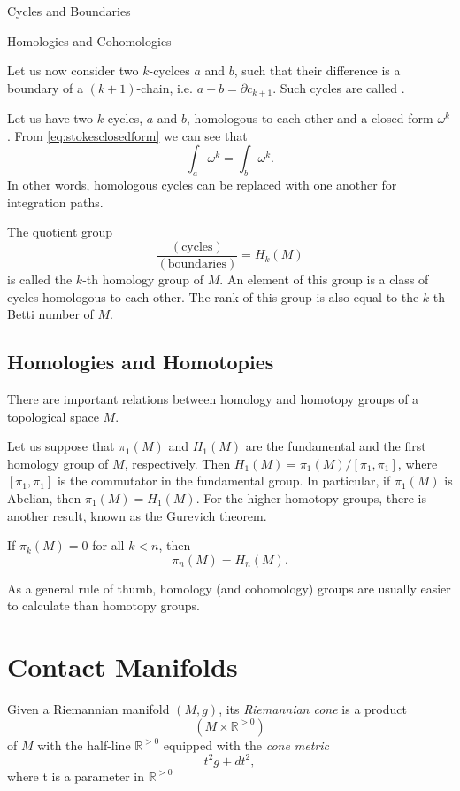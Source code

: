 \begin{subsubsection}{Cycles and Boundaries}
\begin{subsubsection}{Homologies and Cohomologies}
  \begin{definition}
  Let us now consider two $k$-cyclces $a$ and $b$, such that their 
  difference is a boundary of a $(k+1)$-chain, i.e. $a-b = \partial c_{k+1}$.
  Such cycles are called .
\end{definition}
  Let us have two $k$-cycles, $a$ and $b$, homologous to each other and
  a closed form $\omega^k$. From \eqref{eq:stokesclosedform} we can see that 
  \begin{equation}
    \int_a{\omega^k} = \int_b{\omega^k}.
  \end{equation}
  In other words, homologous cycles can be replaced with one another for
  integration paths.
  \begin{definition}
    The quotient group
    \begin{equation}
      \frac{(\text{cycles})}{(\text{boundaries})} = H_k(M)
    \end{equation}
    is called the $k$-th homology group of $M$. An element of this group is
    a class of cycles homologous to each other. The rank of this group is also
    equal to the $k$-th Betti number of $M$.
  \end{definition}
\subsection{Homologies and Homotopies}
There are important relations between homology and homotopy groups of
a topological space $M$.
\par Let us suppose that $\pi_1(M)$ and $H_1(M)$ are the fundamental and the
first homology group of $M$, respectively. Then $H_1(M)
= \pi_1(M)/[\pi_1,\pi_1]$, where $[\pi_1,\pi_1]$ is the commutator in the
fundamental group. In particular, if $\pi_1(M)$ is Abelian, then $\pi_1(M)
= H_1(M)$. For the higher homotopy groups, there is another result, known as
the Gurevich theorem.
\begin{theorem}
  If $\pi_k(M) = 0$ for all $k<n$, then
  \begin{equation}
    \pi_n(M) = H_n(M).
  \end{equation}
\end{theorem}
As a general rule of thumb, homology (and cohomology) groups are usually easier
to calculate than homotopy groups.
    \section{Contact Manifolds}
\begin{definition}
Given a Riemannian manifold $(M,g)$, its \textit{Riemannian cone} is a product
\begin{equation}
(M\times\mathbb{R}^{>0})
\end{equation}
of $M$ with the half-line $\mathbb{R}^{>0}$ equipped with the \textit{cone metric}
\begin{equation}
t^2g+dt^2,
\end{equation}
where t is a parameter in $\mathbb{R}^{>0}$
\end{definition}


\end{subsubsection}
\end{subsubsection}
